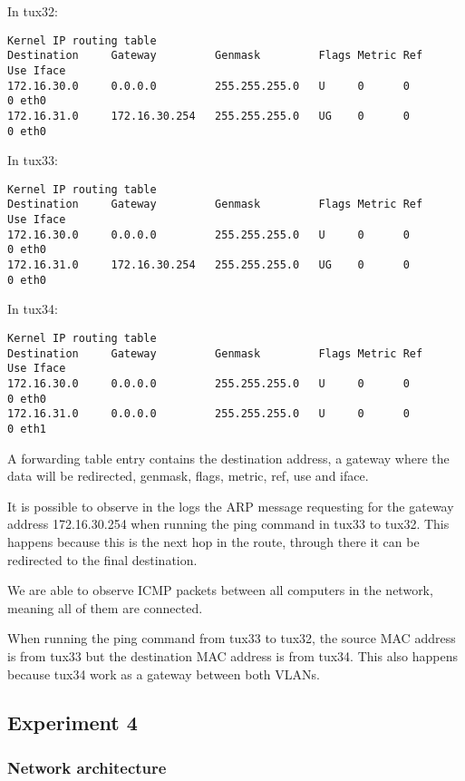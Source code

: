 \documentclass[a4paper, 11pt]{report}
\begin{document}
In tux32:
\begin{lstlisting}[frame=tb, numbers=none]
Kernel IP routing table
Destination     Gateway         Genmask         Flags Metric Ref    Use Iface
172.16.30.0     0.0.0.0         255.255.255.0   U     0      0        0 eth0
172.16.31.0     172.16.30.254   255.255.255.0   UG    0      0        0 eth0
\end{lstlisting}
In tux33:
\begin{lstlisting}[frame=tb, numbers=none]
Kernel IP routing table
Destination     Gateway         Genmask         Flags Metric Ref    Use Iface
172.16.30.0     0.0.0.0         255.255.255.0   U     0      0        0 eth0
172.16.31.0     172.16.30.254   255.255.255.0   UG    0      0        0 eth0
\end{lstlisting}
In tux34:
\begin{lstlisting}[frame=tb, numbers=none]
Kernel IP routing table
Destination     Gateway         Genmask         Flags Metric Ref    Use Iface
172.16.30.0     0.0.0.0         255.255.255.0   U     0      0        0 eth0
172.16.31.0     0.0.0.0         255.255.255.0   U     0      0        0 eth1
\end{lstlisting}

A forwarding table entry contains the destination address, a gateway where the data will be redirected, genmask, flags, metric, ref, use and iface.

It is possible to observe in the logs the ARP message requesting for the gateway address 172.16.30.254 when running the ping command in tux33 to tux32.
This happens because this is the next hop in the route, through there it can be redirected to the final destination.

We are able to observe ICMP packets between all computers in the network, meaning all of them are connected.

When running the ping command from tux33 to tux32, the source MAC address is from tux33 but the destination MAC address is from tux34. This also happens because tux34
work as a gateway between both VLANs.

\subsection{Experiment 4} \label{sec:Exp4}
\subsubsection{Network architecture} \label{sec:Arc4}
\end{document}
